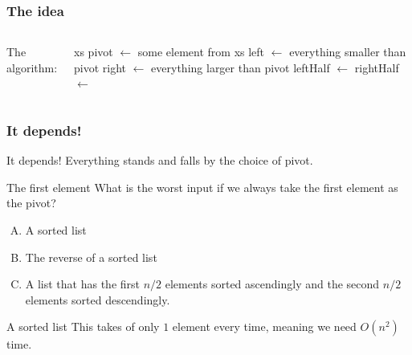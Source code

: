 \begin{frame}
	\frametitle{The idea}
	\begin{overlayarea}{\textwidth}{\textheight}
		\begin{columns}
			The algorithm:
		\begin{algorithmic}
			\State \Return xs
			\EndIf
			\pause
			\State pivot $\gets$ some element from xs
			\State left $\gets$ everything smaller than pivot
			\State right $\gets$ everything larger than pivot
			\State leftHalf $\gets$ 
			\State rightHalf $\gets$ 
			\pause
			\State \Return \alt<5->{leftHalf + pivot + rightHalf}{\dots}
			\EndFunction
		\end{algorithmic}
		
		\end{columns}
	\end{overlayarea}
\end{frame}

\begin{frame}
	\frametitle{It depends!}

	\begin{answerblock}{It depends!}
		Everything stands and falls by the choice of pivot.
	\end{answerblock}
	\pause
	\begin{questionblock}{The first element}
		What is the worst input if we always take the first element as the pivot?
		\begin{enumerate}[A.]
			\item A sorted list
			\item The reverse of a sorted list
			\item A list that has the first $n/2$ elements sorted ascendingly and the second $n/2$ elements sorted descendingly.
		\end{enumerate}
	\end{questionblock}
	\pause
	\begin{answerblock}{A sorted list}
	 This takes of only $1$ element every time, meaning we need $O(n^2)$ time.	
	\end{answerblock}
\end{frame}

